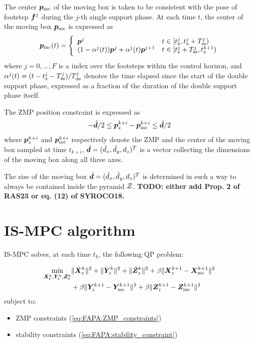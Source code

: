 The center ${\bm{p}}_{\rm mc}$ of the moving box is taken to be consistent with the pose of footstep ${\bm{f}}^j$ during the $j$-th single support phase. At each time $t$, the center of the moving box ${\bm{p}}_{\rm mc}$ is expressed as
\begin{equation}\label{eq:WoS: moving constraint}
{\bm{p}}_{\rm mc}(t) = \Bigg\{
\begin{array}{ll}
{\bm{p}}^j & t\in [t_s^j, t_s^j + T_{\rm ss}^j) \\
(1-\alpha^j(t)){\bm{p}}^j + \alpha^j(t){\bm{p}}^{j+1} & t\in [t_s^j + T_{\rm ss}^j, t_s^{k+1})
\end{array}
\end{equation}
where $j=0,\dots,F$ is a index over the footsteps within the control horizon, and $\alpha^j(t) = (t-t_s^j-T_{\rm ss}^j)/T_{\rm ds}^j$ denotes the time elapsed since the start of the double support phase, expressed as a fraction of the duration of the double support phase itself.

The ZMP position constraint is expressed as
\begin{equation}\label{eq:WoS:ZMP_constraint}
-\tilde{{\bm{d}}} /2 \le {\bm{p}}_z^{k+i} - {\bm{p}}_{\rm mc}^{k+i} \le \tilde{{\bm{d}}} /2
\end{equation}
where ${\bm{p}}_z^{k+i}$ and ${\bm{p}}_{\rm mc}^{k+i}$ respectively denote the ZMP and the center of the moving box sampled at time $t_{k+i}$, $\tilde {{\bm{d}}} = (\tilde d_x, \tilde d_y, d_z)^T$
is a vector collecting the dimensions of the moving box along all three axes.

The size of the moving box $\tilde {{\bm{d}}} = (\tilde d_x, \tilde d_y, d_z)^T$ is determined in such a way to always be contained inside the pyramid $\cal Z$. \textbf{TODO: either add Prop. 2 of RAS23 or eq. (12) of SYROCO18.}

\section{IS-MPC algorithm}
IS-MPC solves, at each time $t_k$, the following QP problem:
\begin{braced}
\begin{equation*}\begin{split}
\min_{\dot{\bm{X}}_\text{z}^k, \dot{\bm{Y}}_\text{z}^k, \dot{\bm{Z}}_\text{z}^k}
&\|\dot{\bm{X}}_z^k\|^2 + \|\dot{\bm{Y}}_z^k\|^2 + \|\dot{\bm{Z}}_z^k\|^2+\beta \|\bm{X}_z^{k+1} - {\bm{X}}_{\rm mc}^{k+1}\|^2 \\& + \beta \|\bm{Y}_z^{k+1} - {\bm{Y}}_{\rm mc}^{k+1}\|^2 + \beta \|\bm{Z}_z^{k+1} - {\bm{Z}}_{\rm mc}^{k+1}\|^2 \\
\end{split}\end{equation*}
\hspace{0.25cm} subject to:
\begin{itemize}
\item ZMP constraints (\ref{eq:FAPA:ZMP_constraints})
\item stability constraints (\ref{eq:FAPA:stability_constraint})
\end{itemize}
\end{braced}

